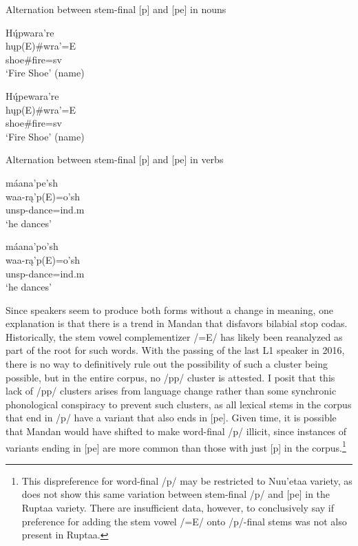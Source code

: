 \begin{exe}
\item\label{fireshoe} Alternation between stem-final [p] and [pe] in nouns

\begin{xlist}
	\item\label{fireshoe1} \glll Hų́pwara're\\
	hųp(E)\#wra'=E\\
	\textnormal{shoe}{\#}\textnormal{fire}=sv\\
	\glt `Fire Shoe' (name) \citep[155]{hollow1973a}

	\item\label{fireshoe2} \glll Hų́pewara're\\
	hųp(E)\#wra'=E\\
	\textnormal{shoe}{\#}\textnormal{fire}=sv\\
	\glt `Fire Shoe' (name) \citep[168]{hollow1973a}

\end{xlist}
\item\label{dancep} Alternation between stem-final [p] and [pe] in verbs

\begin{xlist}
	\item\label{dancep1} \glll máana'pe'sh\\
	waa-rą'p(E)=o'sh\\
	unsp-\textnormal{dance}=ind.m\\
	\glt `he dances' \citep[167]{hollow1970}

	\item\label{dancep2} \glll máana'po'sh\\
	waa-rą'p(E)=o'sh\\
	unsp-\textnormal{dance}=ind.m\\
	\glt `he dances' \citep[167]{hollow1970}
\end{xlist}
\end{exe}

Since speakers seem to produce both forms without a change in meaning, one explanation is that there is a trend in Mandan that disfavors bilabial stop codas. Historically, the stem vowel complementizer /=E/ has likely been reanalyzed as part of the root for such words. With the passing of the last L1 speaker in 2016, there is no way to definitively rule out the possibility of such a cluster being possible, but in the entire corpus, no /pp/ cluster is attested. I posit that this lack of /pp/ clusters arises from language change rather than some synchronic phonological conspiracy to prevent such clusters, as all lexical stems in the corpus that end in /p/ have a variant that also ends in [pe]. Given time, it is possible that Mandan would have shifted to make word-final /p/ illicit, since instances of variants ending in [pe] are more common than those with just [p] in the corpus.\footnote{This dispreference for word-final /p/ may be restricted to Nuu'etaa variety, as  \citet{maximilian1839} does not show this same variation between stem-final /p/ and [pe] in the Ruptaa variety. There are insufficient data, however, to conclusively say if preference for adding the stem vowel /=E/ onto /p/-final stems was not also present in Ruptaa.}

